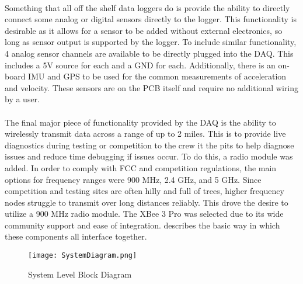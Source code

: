 \paragraph{}
Something that all off the shelf data loggers do is provide the ability to directly connect some analog or digital sensors directly to the logger.
This functionality is desirable as it allows for a sensor to be added without external electronics, so long as sensor output is supported by the logger.
To include similar functionality, 4 analog sensor channels are available to be directly plugged into the DAQ.
This includes a 5V source for each and a GND for each.
Additionally, there is an on-board IMU and GPS to be used for the common measurements of acceleration and velocity.
These sensors are on the PCB itself and require no additional wiring by a user.

\paragraph{}
The final major piece of functionality provided by the DAQ is the ability to wirelessly transmit data across a range of up to 2 miles.
This is to provide live diagnostics during testing or competition to the crew it the pits to help diagnose issues and reduce time debugging if issues occur.
To do this, a radio module was added.
In order to comply with FCC and competition regulations, the main options for frequency ranges were 900 MHz, 2.4 GHz, and 5 GHz.
Since competition and testing sites are often hilly and full of trees, higher frequency nodes struggle to transmit over long distances reliably.
This drove the desire to utilize a 900 MHz radio module.
The XBee 3 Pro was selected due to its wide community support and ease of integration.
 describes the basic way in which these components all interface together.

\begin{figure}[H]
	\centering
	\texttt{[image: SystemDiagram.png]}
	\caption{System Level Block Diagram}
	\label{fig:SysDiagram}
\end{figure}